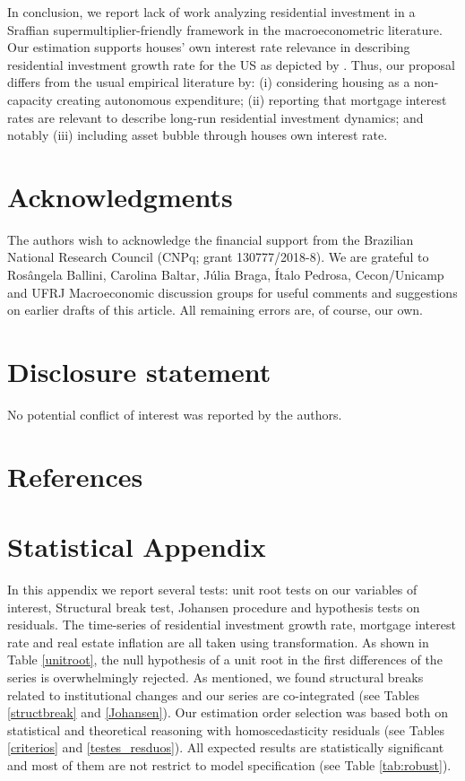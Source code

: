 \documentclass[12pt, a4]{article}
\begin{document}
In conclusion,  we report lack of work analyzing residential investment in a Sraffian supermultiplier-friendly framework in the macroeconometric literature.
Our estimation supports houses' own interest rate relevance in describing residential investment growth rate for the US as depicted by \textcite{teixeira_crescimento_2015}.
Thus, our  proposal differs from the usual empirical literature by:
	(i) considering housing as a non-capacity creating autonomous expenditure;
	(ii) reporting that mortgage interest rates are relevant to describe long-run residential investment dynamics; and notably 
	(iii) including asset bubble through houses own interest rate.


\section*{Acknowledgments}
\label{sec:org1e6d133}
\noindent The authors wish to acknowledge the financial support from the Brazilian National Research Council (CNPq; grant 130777/2018-8). We are grateful to Rosângela Ballini, Carolina Baltar, Júlia Braga, Ítalo Pedrosa, Cecon/Unicamp and UFRJ Macroeconomic discussion groups for useful comments and suggestions on earlier drafts of this article. All remaining errors are, of course, our own.


\section*{Disclosure statement}
\label{sec:org12dd767}
No potential conflict of interest was reported by the authors.

\section*{References}
\label{sec:orga484a97}
\printbibliography[heading=none]


\appendix
\section{Statistical Appendix}
\label{sec:org9fe6240}
\label{appen:A}

In this appendix we report several tests: unit root tests on our variables of interest, Structural break test, Johansen procedure and hypothesis tests on residuals. 
The time-series of residential investment growth rate, mortgage interest rate and real estate inflation are all taken using \textcite{yeo_new_2000} transformation.  
As shown in Table \ref{unitroot}, the null hypothesis of a unit root in the first differences of the series is overwhelmingly rejected.
As mentioned, we found structural breaks related to institutional changes and our series are co-integrated (see Tables \ref{structbreak} and \ref{Johansen}).
Our estimation order selection was based both on statistical and theoretical reasoning with homoscedasticity residuals (see Tables \ref{criterios} and \ref{testes_resduos}).
All expected results are statistically significant and most of them are not restrict to model specification (see Table \ref{tab:robust}).







\end{document}
